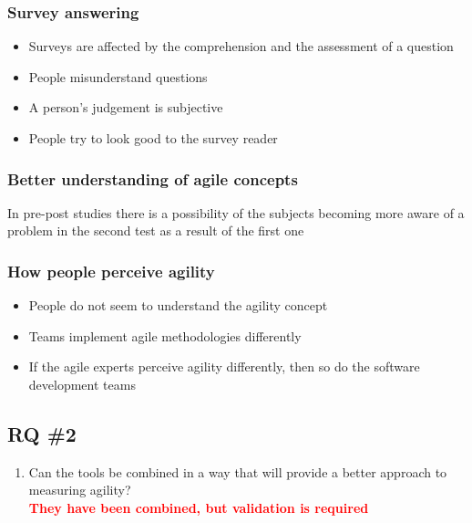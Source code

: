 \clearpage

\subsubsection*{Survey answering}

\begin{itemize}
	\item Surveys are affected by the comprehension and the assessment of a question \cite{Wagner_Zeglovits}
	\item People misunderstand questions
	\item A person's judgement is subjective
	\item People try to look good to the survey reader \cite{feldt_angelis_torkar_samuelsson}
\end{itemize}

\clearpage

\subsubsection*{Better understanding of agile concepts}

In pre-post studies there is a possibility of the subjects becoming more aware of a problem in the second test as a result of the first one

\clearpage

\subsubsection*{How people perceive agility}

\begin{itemize}
	\item People do not seem to understand the agility concept
	\item Teams implement agile methodologies differently
	\item If the agile experts perceive agility differently, then so do the software development teams
\end{itemize}

\clearpage

\subsection*{RQ \#2}

\begin{enumerate}
	\setcounter{enumi}{\theenumTemp}
	\item Can the tools be combined in a way that will provide a better approach to measuring agility? \\ \textcolor{red}{\textbf{They have been combined, but validation is required}}
\end{enumerate}

\clearpage